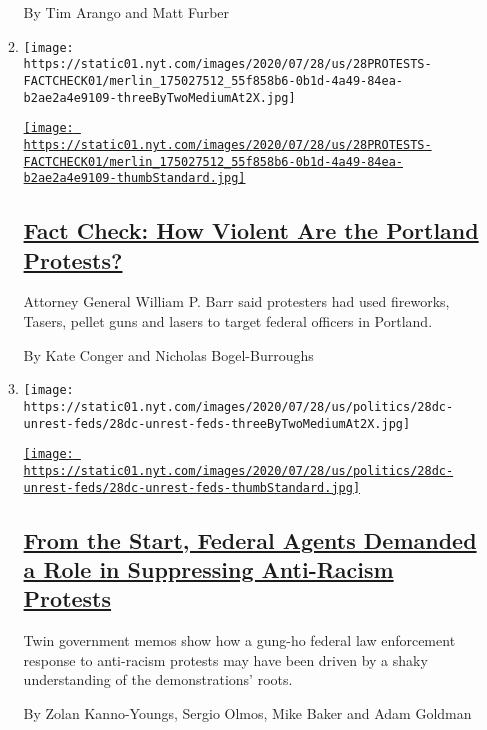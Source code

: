 \begin{enumerate}
\begin{enumerate}
    By Tim Arango and Matt Furber
  \item
    \texttt{[image: https://static01.nyt.com/images/2020/07/28/us/28PROTESTS-FACTCHECK01/merlin\_175027512\_55f858b6-0b1d-4a49-84ea-b2ae2a4e9109-threeByTwoMediumAt2X.jpg]}

    \href{/2020/07/28/us/portland-protests-fact-check.html}{\texttt{[image: https://static01.nyt.com/images/2020/07/28/us/28PROTESTS-FACTCHECK01/merlin\_175027512\_55f858b6-0b1d-4a49-84ea-b2ae2a4e9109-thumbStandard.jpg]}}

    \hypertarget{fact-check-how-violent-are-the-portland-protests}{%
    \subsection{\texorpdfstring{\href{/2020/07/28/us/portland-protests-fact-check.html}{Fact
    Check: How Violent Are the Portland
    Protests?}}{Fact Check: How Violent Are the Portland Protests?}}\label{fact-check-how-violent-are-the-portland-protests}}

    Attorney General William P. Barr said protesters had used fireworks,
    Tasers, pellet guns and lasers to target federal officers in
    Portland.

    By Kate Conger and Nicholas Bogel-Burroughs
  \item
    \texttt{[image: https://static01.nyt.com/images/2020/07/28/us/politics/28dc-unrest-feds/28dc-unrest-feds-threeByTwoMediumAt2X.jpg]}

    \href{/2020/07/28/us/federal-agents-portland-seattle-protests.html}{\texttt{[image: https://static01.nyt.com/images/2020/07/28/us/politics/28dc-unrest-feds/28dc-unrest-feds-thumbStandard.jpg]}}

    \hypertarget{from-the-start-federal-agents-demanded-a-role-in-suppressing-anti-racism-protests}{%
    \subsection{\texorpdfstring{\href{/2020/07/28/us/federal-agents-portland-seattle-protests.html}{From
    the Start, Federal Agents Demanded a Role in Suppressing Anti-Racism
    Protests}}{From the Start, Federal Agents Demanded a Role in Suppressing Anti-Racism Protests}}\label{from-the-start-federal-agents-demanded-a-role-in-suppressing-anti-racism-protests}}

    Twin government memos show how a gung-ho federal law enforcement
    response to anti-racism protests may have been driven by a shaky
    understanding of the demonstrations' roots.

    By Zolan Kanno-Youngs, Sergio Olmos, Mike Baker and Adam Goldman
  \end{enumerate}
\end{enumerate}


